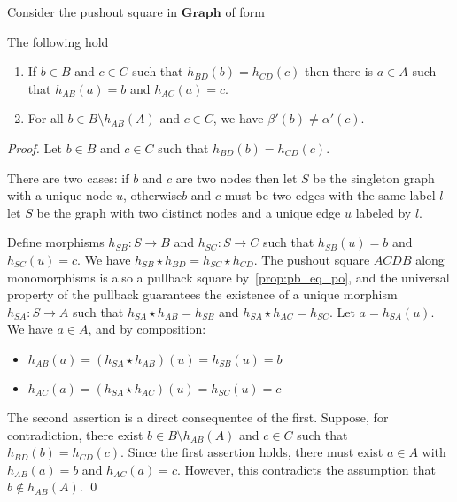 


\begin{lemma}
    \label{lem:b_c_same_img_exist_a}
    Consider the pushout square in $\mathbf{Graph}$ of form
    \begin{center}{\normalfont
    }\end{center} 
    The following hold 
    \begin{enumerate}
        \item  If $ b\in B $ and $ c \in C $ such that $ h_{BD}(b) = h_{CD}(c) $ then there is $ a \in A $ such that $ h_{AB}(a) = b $ and $ h_{AC}(a)= c $.
        \item  For all \( b \in B \setminus h_{AB}(A) \) and \( c \in C \), we have \( \beta'(b) \neq \alpha'(c) \).
    \end{enumerate}
\end{lemma}
\begin{proof}
     Let \( b \in B \) and \( c \in C \) such that \( h_{BD}(b) = h_{CD}(c) \). 
     
     There are two cases: if $b$ and $c$ are two nodes then let \( S \) be the singleton graph with a unique node \( u \), otherwise\textemdash$b$ and $c$ must be two edges with the same label $l$\textemdash let \( S \) be the graph with two distinct nodes and a unique edge \( u \) labeled by $l$.
     
     Define morphisms \( h_{SB}: S \to B \) and \( h_{SC}: S \to C \) such that \( h_{SB}(u) = b \) and \( h_{SC}(u) = c \). We have \( h_{SB} \star h_{BD} = h_{SC} \star h_{CD} \). The pushout square \( ACDB \) along monomorphisms is also a pullback square by~\autoref{prop:pb_eq_po}, and the universal property of the pullback guarantees the existence of a unique morphism \( h_{SA}: S \to A \) such that \( h_{SA} \star h_{AB} = h_{SB} \) and \( h_{SA} \star h_{AC} = h_{SC} \). Let \( a = h_{SA}(u) \). We have \( a \in A \), and by composition: 
     \begin{itemize}
        \item \(h_{AB}(a) = (h_{SA} \star h_{AB})(u) = h_{SB}(u) = b \)
        \item \(h_{AC}(a) = (h_{SA} \star h_{AC})(u) = h_{SC}(u) = c\)
     \end{itemize} 

    The second assertion is a direct consequentce of the first. Suppose, for contradiction, there exist \( b \in B \setminus h_{AB}(A) \) and \( c \in C \) such that \( h_{BD}(b) = h_{CD}(c) \). Since the first assertion holds, there must exist \( a \in A \) with \( h_{AB}(a) = b \) and \( h_{AC}(a) = c \). However, this contradicts the assumption that \( b \notin h_{AB}(A) \).
    \qed
\end{proof}


